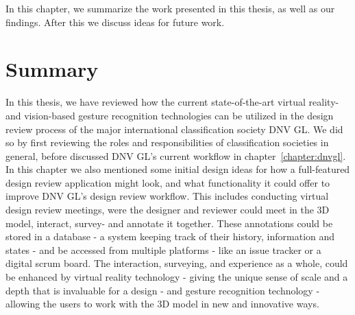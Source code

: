 
In this chapter, we summarize the work presented in this thesis, as well as our findings. After 
this we discuss ideas for future work.


\section{Summary}
In this thesis, we have reviewed how the current state-of-the-art virtual reality- and vision-based gesture recognition technologies can be utilized 
in the design review process of the major international classification society DNV GL. We did so by first reviewing the roles and responsibilities of classification societies 
in general, before discussed DNV GL's current workflow in chapter~\vref{chapter:dnvgl}. In this chapter we also mentioned some initial design ideas for how a full-featured 
design review application might look, and what functionality it could offer to improve DNV GL's design review workflow. This includes
conducting virtual design review meetings, were the designer and reviewer could meet in the 3D model, interact, survey- and annotate it together.
These annotations could be stored in a database - a system keeping track of their history, information and states - and be accessed from multiple platforms - like 
an issue tracker or a digital scrum board. The interaction, surveying, and experience as a whole, could be enhanced by virtual reality technology -
giving the unique sense of scale and a depth that is invaluable for a design - 
and gesture recognition technology - allowing the users to work with the 3D model in new and innovative ways. 

